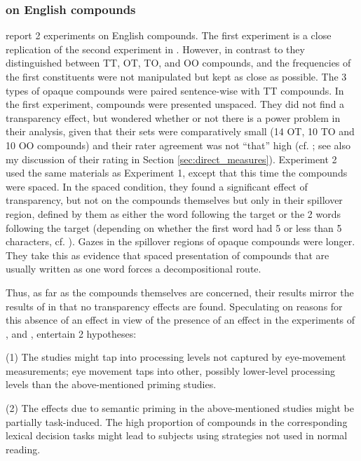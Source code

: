 \subsubsection{\citet{Frissonetal:2008} on English compounds}
\label{sec:frissonetal2008}

\citet{Frissonetal:2008} report 2 experiments on English compounds. The
first experiment is a close replication of the second experiment in
\citet{PollatsekandHyona:2005}. However, in contrast to
\citet{PollatsekandHyona:2005} they distinguished between TT, OT, TO,
and OO compounds, and the frequencies of the first constituents were not
manipulated but kept as close as possible. The 3 types of opaque compounds
were paired sentence-wise with TT compounds. In the first experiment, compounds
were presented unspaced. They did not find a transparency effect, but wondered
whether or not there is a power problem in their analysis, given that their
sets were comparatively small (14 OT, 10 TO and 10 OO compounds) and their rater
agreement was not ``that'' high (cf. \citealt[96]{Frissonetal:2008}; see also
my discussion of their rating in Section
\ref{sec:direct_measures}). Experiment 2 used the same materials as
Experiment 1, except that this time the compounds were spaced. In the spaced
condition, they found a significant effect of transparency, but not on
the compounds themselves but only
in their spillover region, defined by them as either
the word following the target or the 2 words following the target
(depending on whether the first word had 5 or less than 5
characters, cf. \citealt[94]{Frissonetal:2008}). Gazes in the
spillover regions of opaque compounds were longer. They take this as evidence that
spaced presentation of compounds that are usually written as one word forces
a decompositional route. 

Thus, as far as the compounds themselves are concerned, their results
mirror the results of \citet{PollatsekandHyona:2005} in that no
transparency effects are found. Speculating on reasons for this
absence of an effect in view of the presence of an effect in the
experiments of \citet{Sandra:1990}, \citet{Zwitserlood:1994} and
\citet{Libbenetal:2003}, \citet[102]{Frissonetal:2008} entertain 2
hypotheses:
\begin{inparaenum}
\item[(1)] The studies might tap into processing levels not captured by
  eye-movement measurements; eye movement taps into other, possibly lower-level processing levels
  than the above-mentioned priming studies.
\item[(2)] The effects due to semantic priming in the above-mentioned
  studies might be partially task-induced. The high proportion of
  compounds in the corresponding lexical decision tasks might lead to
  subjects using strategies not used in normal reading. 
\end{inparaenum}


